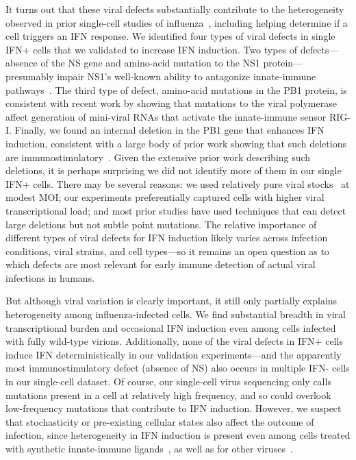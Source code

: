 \documentclass[9pt,lineno]{elife}
\begin{document}
It turns out that these viral defects substantially contribute to the heterogeneity observed in prior single-cell studies of influenza~\citep{russell2018extreme, steuerman2018dissection, heldt2015single, sjaastad2018distinct}, including helping determine if a cell triggers an IFN response.
We identified four types of viral defects in single IFN+ cells that we validated to increase IFN induction. 
Two types of defects---absence of the NS gene and amino-acid mutation to the NS1 protein---presumably impair NS1's well-known ability to antagonize innate-immune pathways~\citep{garcia1998influenza, hale2008multifunctional}.
The third type of defect, amino-acid mutations in the PB1 protein, is consistent with recent work by \citet{velthuis2018mini} showing that mutations to the viral polymerase affect generation of mini-viral RNAs that activate the innate-immune sensor RIG-I.
Finally, we found an internal deletion in the PB1 gene that enhances IFN induction, consistent with a large body of prior work showing that such deletions are immunostimulatory~\citep{baum2010preference, tapia2013defective, boergeling2015evidence, dimmock2015cloned}.
Given the extensive prior work describing such deletions, it is perhaps surprising we did not identify more of them in our single IFN+ cells.
There may be several reasons: we used relatively pure viral stocks~\citep{xue2016propagation} at modest MOI; our experiments preferentially captured cells with higher viral transcriptional load; and most prior studies have used techniques that can detect large deletions but not subtle point mutations.
The relative importance of different types of viral defects for IFN induction likely varies across infection conditions, viral strains, and cell types---so it remains an open question as to which defects are most relevant for early immune detection of actual viral infections in humans.

But although viral variation is clearly important, it still only partially explains heterogeneity among influenza-infected cells.
We find substantial breadth in viral transcriptional burden and occasional IFN induction even among cells infected with fully wild-type virions.
Additionally, none of the viral defects in IFN+ cells induce IFN deterministically in our validation experiments---and the apparently most immunostimulatory defect (absence of NS) also occurs in multiple IFN- cells in our single-cell dataset.
Of course, our single-cell virus sequencing only calls mutations present in a cell at relatively high frequency, and so could overlook low-frequency mutations that contribute to IFN induction.
However, we suspect that stochasticity or pre-existing cellular states also affect the outcome of infection, since heterogeneity in IFN induction is present even among cells treated with synthetic innate-immune ligands~\citep{shalek2013single, shalek2014single, wimmers2018single, bhushal2017cell}, as well as for other viruses~\citep{oneal2018west}.
\end{document}
